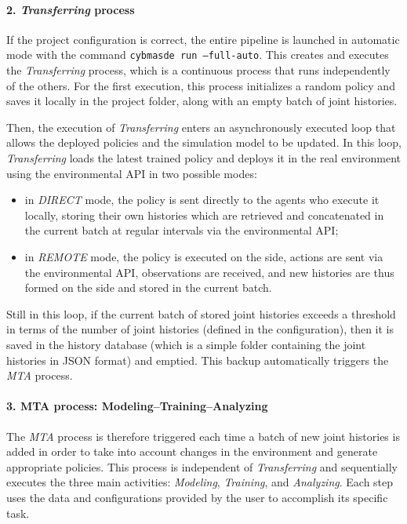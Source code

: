 \paragraph{2. \textit{Transferring} process}

If the project configuration is correct, the entire pipeline is launched in automatic mode with the command \texttt{cybmasde run --full-auto}. This creates and executes the \textit{Transferring} process, which is a continuous process that runs independently of the others. For the first execution, this process initializes a random policy and saves it locally in the project folder, along with an empty batch of joint histories.

Then, the execution of \textit{Transferring} enters an asynchronously executed loop that allows the deployed policies and the simulation model to be updated. In this loop, \textit{Transferring} loads the latest trained policy and deploys it in the real environment using the environmental API in two possible modes:
\begin{itemize}
  \item in \textit{DIRECT} mode, the policy is sent directly to the agents who execute it locally, storing their own histories which are retrieved and concatenated in the current batch at regular intervals via the environmental API;
  \item in \textit{REMOTE} mode, the policy is executed on the  side, actions are sent via the environmental API, observations are received, and new histories are thus formed on the  side and stored in the current batch.
\end{itemize}

Still in this loop, if the current batch of stored joint histories exceeds a threshold in terms of the number of joint histories (defined in the configuration), then it is saved in the history database (which is a simple folder containing the joint histories in JSON format) and emptied. This backup automatically triggers the \textit{MTA} process.

\paragraph {3. MTA process: Modeling–Training–Analyzing}

The \textit{MTA} process is therefore triggered each time a batch of new joint histories is added in order to take into account changes in the environment and generate appropriate policies. This process is independent of \textit{Transferring} and sequentially executes the three main activities: \textit{Modeling}, \textit{Training}, and \textit{Analyzing}. Each step uses the data and configurations provided by the user to accomplish its specific task.

